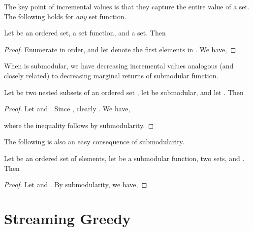 \documentclass[oneside,letterpaper]{scrartcl} \usepackage{macros}
\begin{document}
The key point of incremental values is that they capture the entire
value of a set. The following holds for \emph{any} set function.
\begin{lemma}Let  be an ordered set,  a set function, and  a set. Then
  
  \begin{proof}
    Enumerate  in order, and let  denote the first  elements in . We
    have,
    
  \end{proof}
\end{lemma}
When  is submodular, we have decreasing incremental values
analogous (and closely related) to decreasing marginal returns of
submodular function.
\begin{lemma}
  Let  be two nested subsets of an
  ordered set , let 
  be submodular, and let . Then
  
  \begin{proof}
    Let  and . Since , clearly . We have,
    
    where the inequality follows by submodularity.
  \end{proof}
\end{lemma}
The following is also an easy consequence of submodularity.
\begin{lemma}
  Let  be an ordered set of elements, let  be a submodular function,  two sets, and . Then
  
  \begin{proof}
    Let  and . By submodularity, we have,
    
  \end{proof}
\end{lemma}
\FloatBarrier
\section{Streaming Greedy}

\newcommand{\finalset}{\tilde{S}}\newcommand{\setbefore}[1]{S_{#1}^-} \newcommand{\setafter}[1]{S_{#1}^+} \newcommand{\takens}{U}\newcommand{\taken}{u} \newcommand{\candidates}{C}
\newcommand{\candidatesfor}[1]{\candidates_{#1}}
\newcommand{\gain}{\delta} \newcommand{\gainof}[1]{\delta_{#1}} \newcommand{\deleted}{d} \newcommand{\deleteds}{\takens \setminus \finalset} 
\end{document}
